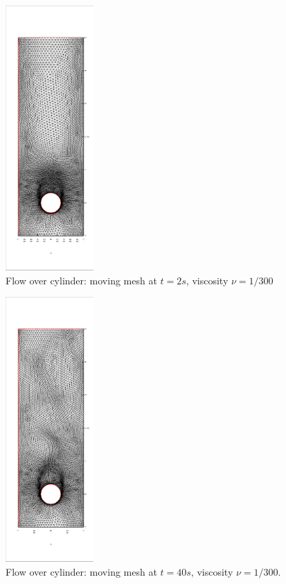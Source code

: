 \documentclass{eajam}
\begin{document}
      
      \begin{figure}[!htbp]
        \centering
        \includegraphics[width = 0.3\textwidth, angle = -90]{picture/obstacle_flow_data/mesh_t_2s.eps}
        \caption{\small Flow over cylinder: moving mesh at $t = 2s$,
          viscosity $\nu = 1/300$}
        \label{fig::cylinder_mesh_2s}
      \end{figure}

      \begin{figure}[!htbp]
        \centering
        \includegraphics[width = 0.3\textwidth, angle = -90]{picture/obstacle_flow_data/mesh_t_40s.eps}
        \caption{\small Flow over cylinder: moving mesh at $t = 40s$,
          viscosity $\nu = 1/300$.}
        \label{fig::cylinder_mesh_40s}
      \end{figure}
\end{document}
